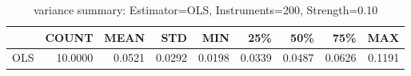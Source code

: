 \begin{table}[ht]
\centering
\caption{variance summary: Estimator=OLS, Instruments=200, Strength=0.10}
\begin{tabular}{lrrrrrrrr}
\toprule
 & COUNT & MEAN & STD & MIN & 25\% & 50\% & 75\% & MAX \\
\midrule
OLS & 10.0000 & 0.0521 & 0.0292 & 0.0198 & 0.0339 & 0.0487 & 0.0626 & 0.1191 \\
\bottomrule
\end{tabular}
\end{table}
